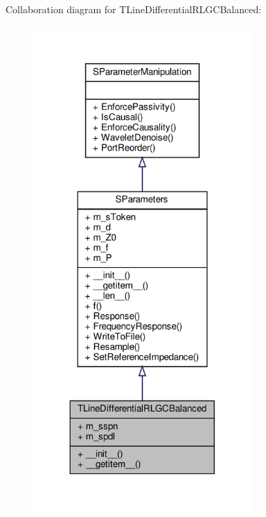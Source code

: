 Collaboration diagram for T\+Line\+Differential\+R\+L\+G\+C\+Balanced\+:
\nopagebreak
\begin{figure}[H]
\begin{center}
\leavevmode
\includegraphics[width=236pt]{classSignalIntegrity_1_1SParameters_1_1Devices_1_1TLineDifferentialRLGCBalanced_1_1TLineDifferentialRLGCBalanced__coll__graph}
\end{center}
\end{figure}
